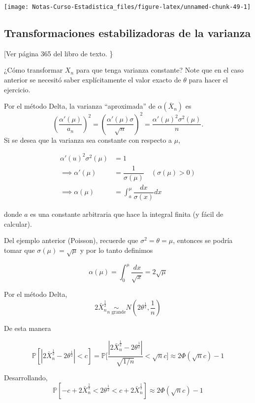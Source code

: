 \documentclass[
  12pt,
]{book}
\begin{document}
\begin{center}\texttt{[image: Notas-Curso-Estadistica\_files/figure-latex/unnamed-chunk-49-1]} \end{center}

\hypertarget{transformaciones-estabilizadoras-de-la-varianza}{%
\subsection{Transformaciones estabilizadoras de la varianza}\label{transformaciones-estabilizadoras-de-la-varianza}}

{[}Ver página 365 del libro de texto. \}

¿Cómo transformar \(X_n\) para que tenga varianza constante? Note que en el caso
anterior se necesitó saber explícitamente el valor exacto de \(\theta\) para
hacer el ejercicio.

Por el método Delta, la varianza ``aproximada'' de \(\alpha(\bar X_n)\) es \[\left(
\dfrac{\alpha'(\mu)}{a_n}\right)^2 =\left( \dfrac{\alpha'(\mu)\sigma}{\sqrt n}\right)^2 =
\dfrac{\alpha'(\mu)^2\sigma^2(\mu)}{n}.\] Si se desea que la varianza sea constante con
respecto a \(\mu\),

\begin{align*}
\alpha'(u)^2\sigma^2(\mu) &= 1 \\
\implies \alpha'(\mu) & = \dfrac{1}{\sigma(\mu)} \quad (\sigma(\mu)>0)\\
\implies \alpha(\mu) &=
\int_{a}^{\mu} \dfrac{dx}{\sigma(x)}dx
\end{align*}

donde \(a\) es una constante arbitraria que hace la integral finita (y fácil de
calcular).

Del ejemplo anterior (Poisson), recuerde que \(\sigma ^{2} = \theta = \mu\), entonces se
podría tomar que \(\sigma(\mu) = \sqrt{\mu}\) y por lo tanto definimos

\[
\alpha(\mu) = \int_{0}^\mu\dfrac{dx}{\sqrt x} = 2\sqrt \mu
\]

Por el método Delta,\\
\[
2\bar X_n^{\frac12} \underset{n \text{ grande}}{\sim}
N\left(2\theta^{\frac 12},\dfrac1n\right)
\]

De esta manera

\[\mathbb P[|2\bar X_n^{\frac12}-2\theta^{\frac12}|<c] =\mathbb P\Bigg[\dfrac{|2\bar
X_n^{\frac12}-2\theta^{\frac12}|}{\sqrt{1/n}}<\sqrt nc\Bigg] \approx 2\Phi(\sqrt nc)-1 \]

Desarrollando, \[\mathbb P[-c+2\bar X_n^{\frac12}<2\theta^{\frac 12}<c+2\bar
X_n^{\frac12}]\approx 2\Phi(\sqrt nc)-1 \]
\end{document}
